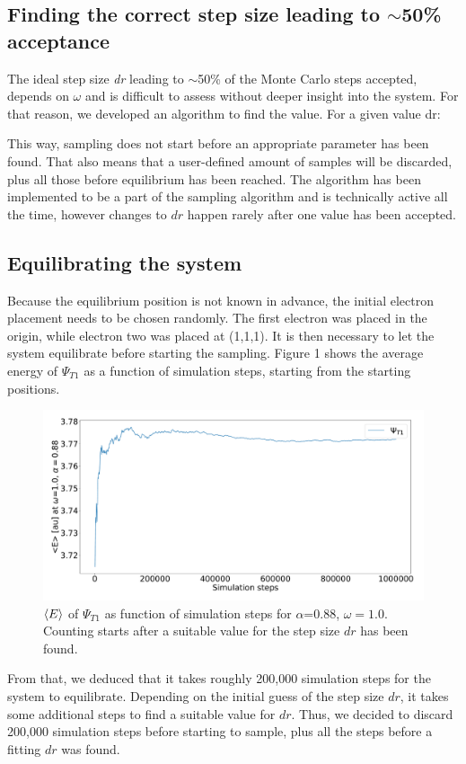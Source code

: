\documentclass[10pt,a4paper]{article}
\begin{document}
\subsection{Finding the correct step size leading to $\sim$50\% acceptance}
The ideal step size \textit{dr} leading to $\sim$50\% of the Monte Carlo steps accepted, depends on $\omega$ and is difficult to assess without deeper insight into the system. For that reason, we developed an algorithm to find the value. For a given value dr:\\
\IncMargin{1em}
\begin{algorithm}[H]  
\end{algorithm}
\DecMargin{1em}
This way, sampling does not start before an appropriate parameter has been found. That also means that a user-defined amount of samples will be discarded, plus all those before equilibrium has been reached. The algorithm has been implemented to be a part of the sampling algorithm and is technically active all the time, however changes to $dr$ happen rarely after one value has been accepted. 
\subsection{Equilibrating the system}
Because the equilibrium position is not known in advance, the initial electron placement needs to be chosen randomly. The first electron was placed in the origin, while electron two was placed at (1,1,1). It is then necessary to let the system equilibrate before starting the sampling. Figure 1 shows the average energy of $\Psi_{T1}$ as a function of simulation steps, starting from the starting positions.
\begin{figure}[H]
\centering
\includegraphics[width=\textwidth]{Energy_variation.pdf}
\caption[<E> as function of simulation steps]{$\braket{E}$ of $\Psi_{T1}$ as function of simulation steps for $\alpha$=0.88, $\omega=1.0$. Counting starts after a suitable value for the step size $dr$ has been found.}
\end{figure}
From that, we deduced that it takes roughly 200,000 simulation steps for the system to equilibrate. Depending on the initial guess of the step size $dr$, it takes some additional steps to find a suitable value for $dr$. Thus, we decided to discard 200,000 simulation steps before starting to sample, plus all the steps before a fitting $dr$ was found.
\end{document}
